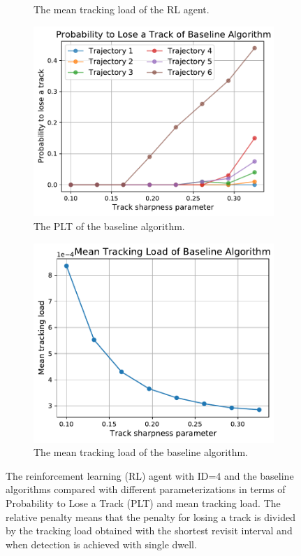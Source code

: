 \documentclass[english, 12pt, a4paper, elec, utf8, a-1b, online]{aaltothesis}
\begin{document}
\begin{figure}
\begin{subfigure}[b]{0.45\textwidth}
        \caption{The mean tracking load of the RL agent.}
        \label{fig:penalty_load}
    \end{subfigure}
    \begin{subfigure}[b]{0.45\textwidth}
        \includegraphics[width=\linewidth]{figures/benchmark/Simulations/plt_baseline.pdf}
        \caption{The PLT of the baseline algorithm.}
        \label{fig:baseline_plt}
    \end{subfigure}
    \hfill
    \begin{subfigure}[b]{0.45\textwidth}
        \includegraphics[width=\linewidth]{figures/benchmark/Simulations/tracking_load_baseline.pdf}
        \caption{The mean tracking load of the baseline algorithm.}
        \label{fig:baseline_load}
    \end{subfigure}
    \caption{The reinforcement learning (RL) agent with ID=4 and the baseline algorithms compared with different parameterizations in terms of Probability to Lose a Track (PLT) and mean tracking load. The relative penalty means that the penalty for losing a track is divided by the tracking load obtained with the shortest revisit interval and when detection is achieved with single dwell.}
    \label{fig:comparison}
\end{figure}
\end{document}
